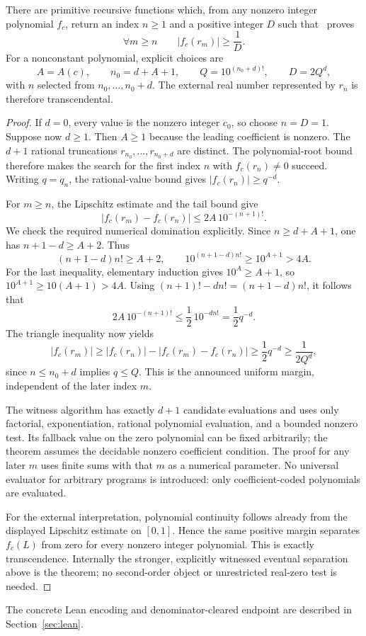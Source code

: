 \begin{theorem}
\label{tr:transcendence}
There are primitive recursive functions which, from any nonzero integer
polynomial $f_c$, return an index $n\ge1$ and a positive integer $D$
such that \ipra\ proves
\[
 \forall m\ge n\qquad |f_c(r_m)|\ge\frac1D.
\]
For a nonconstant polynomial, explicit choices are
\[
 A=A(c),\qquad n_0=d+A+1,\qquad
 Q=10^{(n_0+d)!},\qquad D=2Q^d,
\]
with $n$ selected from $n_0,\ldots,n_0+d$. The external real number
represented by $r_n$ is therefore transcendental.
\end{theorem}
\begin{proof}
If $d=0$, every value is the nonzero integer $c_0$, so choose
$n=D=1$. Suppose now $d\ge1$. Then $A\ge1$ because the leading
coefficient is nonzero. The $d+1$ rational truncations
$r_{n_0},\ldots,r_{n_0+d}$ are distinct. The polynomial-root bound
therefore makes the search for the first index $n$ with $f_c(r_n)\ne0$
succeed. Writing $q=q_n$, the rational-value bound gives
$|f_c(r_n)|\ge q^{-d}$.

For $m\ge n$, the Lipschitz estimate and the tail bound give
\[
 |f_c(r_m)-f_c(r_n)|\le 2A\,10^{-(n+1)!}.
\]
We check the required numerical domination explicitly. Since
$n\ge d+A+1$, one has $n+1-d\ge A+2$. Thus
\[
 (n+1-d)n!\ge A+2,
 \qquad 10^{(n+1-d)n!}\ge10^{A+1}>4A.
\]
For the last inequality, elementary induction gives $10^A\ge A+1$,
so $10^{A+1}\ge10(A+1)>4A$. Using
$(n+1)!-dn!=(n+1-d)n!$, it follows that
\[
 2A\,10^{-(n+1)!}\le\frac12\,10^{-dn!}
       =\frac12q^{-d}.
\]
The triangle inequality now yields
\[
 |f_c(r_m)|\ge |f_c(r_n)|-|f_c(r_m)-f_c(r_n)|
              \ge\frac12q^{-d}\ge\frac1{2Q^d},
\]
since $n\le n_0+d$ implies $q\le Q$. This is the announced
uniform margin, independent of the later index $m$.

The witness algorithm has exactly $d+1$ candidate evaluations and uses
only factorial, exponentiation, rational polynomial evaluation, and a
bounded nonzero test. Its fallback value on the zero polynomial can
be fixed arbitrarily; the theorem assumes the decidable nonzero
coefficient condition. The proof for any later $m$ uses finite sums
with that $m$ as a numerical parameter. No universal evaluator for
arbitrary programs is introduced: only coefficient-coded polynomials
are evaluated.

For the external interpretation, polynomial continuity follows already
from the displayed Lipschitz estimate on $[0,1]$. Hence the same positive
margin separates $f_c(L)$ from zero for every nonzero integer
polynomial. This is exactly transcendence. Internally the stronger,
explicitly witnessed eventual separation above is the theorem; no
second-order object or unrestricted real-zero test is needed.
\end{proof}


The concrete Lean encoding and denominator-cleared endpoint are described in Section~\ref{sec:lean}.
